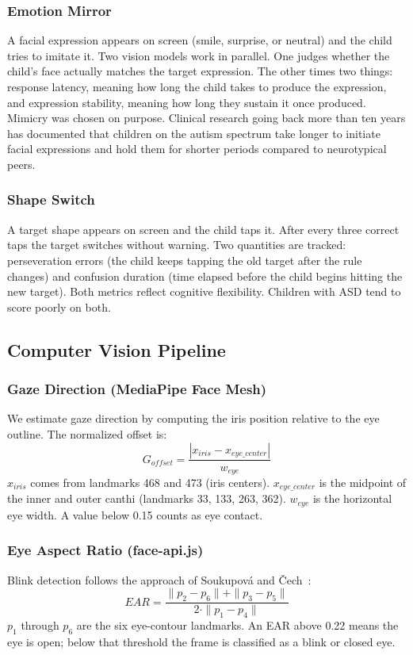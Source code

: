 \documentclass[conference]{IEEEtran}
\begin{document}
\subsubsection{Emotion Mirror}
A facial expression appears on screen (smile, surprise, or neutral) and the child tries to imitate it. Two vision models work in parallel. One judges whether the child's face actually matches the target expression. The other times two things: response latency, meaning how long the child takes to produce the expression, and expression stability, meaning how long they sustain it once produced. Mimicry was chosen on purpose. Clinical research going back more than ten years has documented that children on the autism spectrum take longer to initiate facial expressions and hold them for shorter periods compared to neurotypical peers.

\subsubsection{Shape Switch}
A target shape appears on screen and the child taps it. After every three correct taps the target switches without warning. Two quantities are tracked: perseveration errors (the child keeps tapping the old target after the rule changes) and confusion duration (time elapsed before the child begins hitting the new target). Both metrics reflect cognitive flexibility. Children with ASD tend to score poorly on both.

\subsection{Computer Vision Pipeline}

\subsubsection{Gaze Direction (MediaPipe Face Mesh)}
We estimate gaze direction by computing the iris position relative to the eye outline. The normalized offset is:
\begin{equation}
G_{offset} = \frac{|x_{iris} - x_{eye\_center}|}{w_{eye}}
\label{eq:gaze}
\end{equation}
$x_{iris}$ comes from landmarks 468 and 473 (iris centers). $x_{eye\_center}$ is the midpoint of the inner and outer canthi (landmarks 33, 133, 263, 362). $w_{eye}$ is the horizontal eye width. A value below 0.15 counts as eye contact.

\subsubsection{Eye Aspect Ratio (face-api.js)}
Blink detection follows the approach of Soukupov\'{a} and \v{C}ech~\cite{soukupova2016ear}:
\begin{equation}
EAR = \frac{\|p_2 - p_6\| + \|p_3 - p_5\|}{2 \cdot \|p_1 - p_4\|}
\label{eq:ear}
\end{equation}
$p_1$ through $p_6$ are the six eye-contour landmarks. An EAR above 0.22 means the eye is open; below that threshold the frame is classified as a blink or closed eye.
\end{document}
